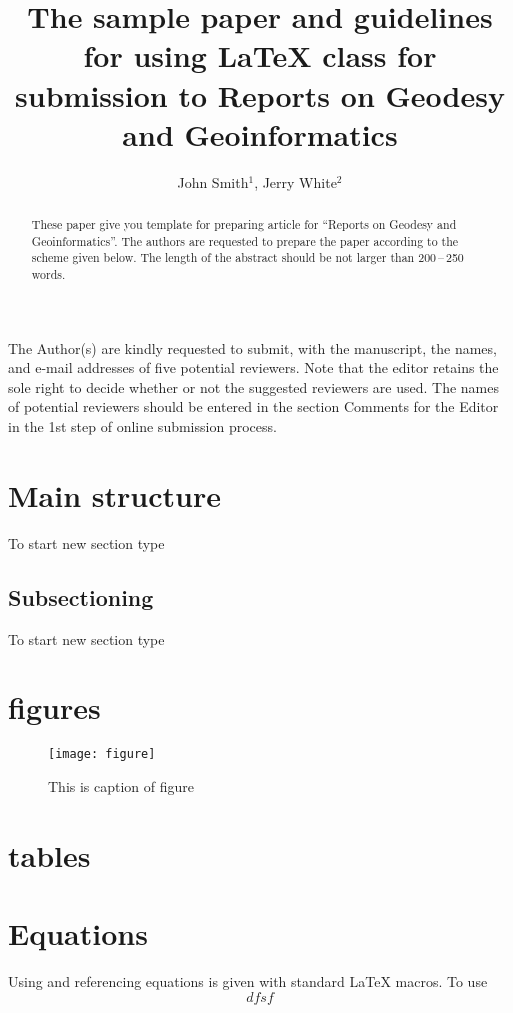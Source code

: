 \documentclass[review]{rog}
\title{The sample paper and guidelines for using \LaTeX{} class for submission to Reports on Geodesy and Geoinformatics}
\author{John Smith$^1$, Jerry White$^2$}
\begin{document}
    \maketitle


    \begin{abstract}
      These paper give you template for preparing article for ``Reports on 
      Geodesy and Geoinformatics''. The authors are requested to prepare the 
      paper according to the scheme given below. The length of the abstract 
      should be not larger than 200\,–\,250 words.
    \end{abstract}

    The Author(s) are kindly requested to submit, with the manuscript, 
    the names, and e-mail addresses of five potential reviewers. Note 
    that the editor retains the sole right to decide whether or not the 
    suggested reviewers are used. The names of potential reviewers should 
    be entered in the section Comments for the Editor in the 1st step of 
    online submission process.
    \cite{hw1997}

    \blindtext[10]

  \section{Main structure}
    To start new section type 
  \subsection{Subsectioning}
    To start new section type 

  \section{figures}
    \begin{figure}
      \texttt{[image: figure]}
      \caption{This is caption of figure}
    \end{figure}

  \section{tables}

  \section{Equations}
    Using and referencing equations 
    is given with standard \LaTeX{} macros.
    To use
    \begin{equation}
      dfsf
    \end{equation}

    
\end{document}
